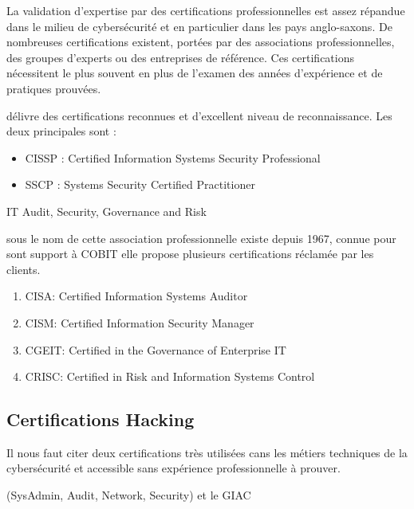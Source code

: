 La validation d'expertise par des certifications professionnelles est assez répandue dans le milieu de cybersécurité et en particulier dans les pays anglo-saxons. De nombreuses certifications existent, portées par des associations professionnelles, des groupes d'experts ou des entreprises de référence. Ces certifications nécessitent le plus souvent en plus de l'examen des années d'expérience et de pratiques prouvées.



   délivre des certifications reconnues et d'excellent niveau de reconnaissance.
Les deux principales sont :
\begin{itemize}
  \item CISSP : Certified Information Systems Security Professional
  \item SSCP : Systems Security Certified Practitioner
\end{itemize}


 IT Audit, Security, Governance and Risk 

sous le nom de  cette association professionnelle existe depuis 1967, connue pour sont support à COBIT elle propose plusieurs certifications réclamée par les clients. 


\begin{enumerate}
  \item CISA: Certified Information Systems Auditor
  \item CISM: Certified Information Security Manager
 \item CGEIT: Certified in the Governance of Enterprise IT
  \item CRISC: Certified in Risk and Information Systems Control
\end{enumerate}


\subsection{Certifications Hacking} 

Il nous faut citer deux certifications très utilisées cans les métiers techniques de la cybersécurité et accessible sans expérience professionnelle à prouver.

 (SysAdmin, Audit, Network, Security) et le GIAC 

